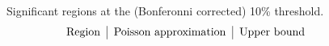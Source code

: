 \documentclass[dvips, lscape]{foils}
\begin{document}
\newpage
Significant regions at the (Bonferonni corrected) 10\% threshold.
{\small
$$
\hspace{-1.5cm}
\begin{tabular}{rrrrr|ccc|cc}
  \multicolumn{5}{c|}{Region} & \multicolumn{3}{c|}{Poisson approximation}
  & \multicolumn{2}{c}{Upper bound} \\
  
\end{tabular}
$$
}

\end{document}
